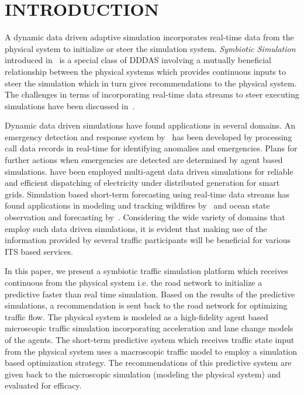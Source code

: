 \documentclass{wscpaperproc}
\theoremstyle{wsc}
\begin{document}
\section{INTRODUCTION}
\label{sec:intro}


A  dynamic data driven adaptive simulation incorporates real-time data from the physical system to initialize or steer the simulation system. {\it Symbiotic Simulation} introduced in~\cite{fujimotoeditors} is a special class of DDDAS involving a mutually beneficial relationship between the physical systems which provides continuous inputs to steer the simulation which in turn gives recommendations to the physical system. The challenges in terms of incorporating real-time data streams to steer executing simulations have been discussed in~\cite{darema2004dynamic}. 

Dynamic data driven simulations have found applications in several domains. An emergency detection and response system by~ has been developed by processing call data records in real-time for identifying anomalies and emergencies. Plans for further actions when emergencies are detected are determined by agent based simulations. \cite{celik2013dddams} have been employed multi-agent data driven simulations for reliable and efficient dispatching of electricity under distributed generation for smart grids. Simulation based short-term forecasting using real-time data streams has found applications in modeling and tracking wildfires by~ and ocean state observation and forecasting by~. Considering the wide variety of domains that employ such data driven simulations, it is evident that making use of the information provided by several traffic participants will be beneficial for various ITS based services.

In this paper, we present a symbiotic traffic simulation platform which receives continuous from the physical system i.e. the road network to initialize a predictive faster than real time simulation. Based on the results of the predictive simulations, a recommendation is sent back to the road network for optimizing traffic flow. The physical system is modeled as a high-fidelity agent based microscopic traffic simulation incorporating acceleration and lane change models of the agents. The short-term predictive system which receives traffic state input from the physical system uses a macroscopic traffic model to employ a simulation based optimization strategy. The recommendations of this predictive system are given back to the microscopic simulation (modeling the physical system) and evaluated for efficacy.
\end{document}

